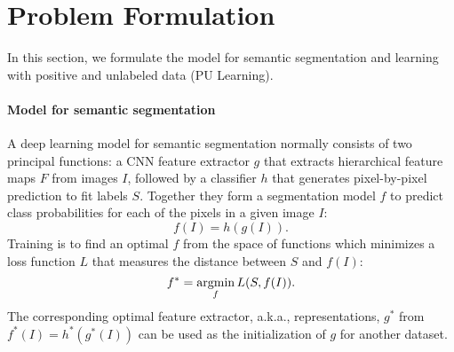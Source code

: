 \section{Problem Formulation}
\label{sec:formulation}
In this section, we formulate the model for semantic segmentation and learning with positive and unlabeled data (PU Learning).

\paragraph{Model for semantic segmentation}
A deep learning model for semantic segmentation normally consists of two principal functions: a CNN feature extractor $g$ that extracts hierarchical feature maps $F$ from images $I$, followed by a classifier $h$ that generates pixel-by-pixel prediction to fit labels $S$.
Together they form a segmentation model $f$ to predict class probabilities for each of the pixels in a given image $I$:
\begin{equation}
  f(I) = h(g(I)).
\end{equation}
Training is to find an optimal $f$ from the space of functions which minimizes a loss function $L$ that measures the distance between $S$ and $f(I)$:
\begin{equation}
  f^{\ast} = \operatorname*{argmin}_{f}{L(S, f(I))}.
\end{equation}
The corresponding optimal feature extractor, a.k.a., representations, $g^{\ast}$ from $f^{\ast}(I)=h^{\ast}(g^{\ast}(I))$ can be used as the initialization of $g$ for another dataset.



